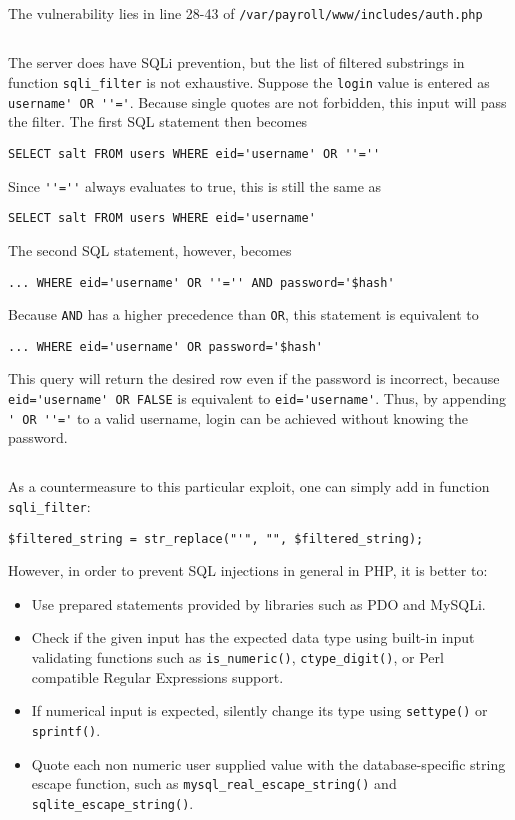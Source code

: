 \documentclass[11pt]{article}
\begin{document}
\subsection{}
The vulnerability lies in line 28-43 of \texttt{/var/payroll/www/includes/auth.php}
\subsection{}
The server does have SQLi prevention, but the list of filtered substrings in function \verb|sqli_filter| is not exhaustive. Suppose the \texttt{login} value is entered as \verb|username' OR ''='|. Because single quotes are not forbidden, this input will pass the filter. The first SQL statement then becomes
\begin{verbatim}
SELECT salt FROM users WHERE eid='username' OR ''=''
\end{verbatim}
Since \verb|''=''| always evaluates to true, this is still the same as
\begin{verbatim}
SELECT salt FROM users WHERE eid='username'
\end{verbatim}
The second SQL statement, however, becomes
\begin{verbatim}
... WHERE eid='username' OR ''='' AND password='$hash'
\end{verbatim}
Because \verb|AND| has a higher precedence than \verb|OR|, this statement is equivalent to
\begin{verbatim}
... WHERE eid='username' OR password='$hash'
\end{verbatim}
This query will return the desired row even if the password is incorrect, because \verb|eid='username' OR FALSE| is equivalent to \verb|eid='username'|. Thus, by appending \verb|' OR ''='| to a valid username, login can be achieved without knowing the password.

\subsection{}
As a countermeasure to this particular exploit, one can simply add in function \verb|sqli_filter|:
\begin{verbatim}
$filtered_string = str_replace("'", "", $filtered_string);
\end{verbatim} 
However, in order to prevent SQL injections in general in PHP, it is better to:
\begin{itemize}
\item Use prepared statements provided by libraries such as PDO and MySQLi.
\item Check if the given input has the expected data type using built-in input validating functions such as \verb|is_numeric()|, \verb|ctype_digit()|, or Perl compatible Regular Expressions support.
\item If numerical input is expected, silently change its type using \verb|settype()| or \verb|sprintf()|.
\item Quote each non numeric user supplied value with the database-specific string escape function, such as \verb|mysql_real_escape_string()| and \verb|sqlite_escape_string()|.
\end{itemize}
\end{document}
